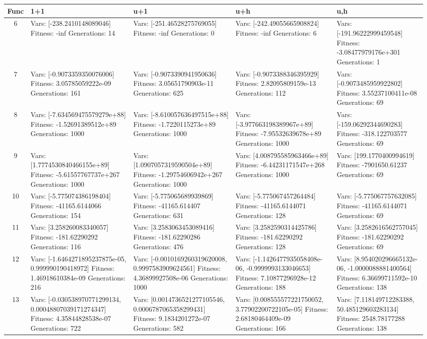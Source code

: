 \documentclass[landscape,11pt]{article}
\begin{document}
\begin{tabular}{|c|p{5.4cm}|p{5.4cm}|p{5.4cm}|p{5.4cm}|}
\hline
Func & 1+1 & u+1 & u+h & u,h \\ 
\hline 6 & Vars: [-238.2410148089046] Fitness: -inf Generations: 14 & Vars: [-251.46528275769055] Fitness: -inf Generations: 0 & Vars: [-242.49055665908824] Fitness: -inf Generations: 6 & Vars: [-191.96222999459548] Fitness: -3.08477979176e+301 Generations: 1 \\
 \hline 
 7 & Vars: [-0.9073359350076006] Fitness: 3.05785059222e-09 Generations: 161 & Vars: [-0.9073390941950636] Fitness: 3.05651790903e-11 Generations: 625 & Vars: [-0.9073388346395929] Fitness: 2.82095809159e-13 Generations: 112 & Vars: [-0.9073485959922802] Fitness: 3.55237100411e-08 Generations: 69 \\
 \hline 
 8 & Vars: [-7.634569475579279e+88] Fitness: -1.52691389512e+89 Generations: 1000 & Vars: [-8.610057636497515e+88] Fitness: -1.7220115273e+89 Generations: 1000 & Vars: [-3.977663198389967e+89] Fitness: -7.95532639678e+89 Generations: 1000 & Vars: [-159.06292344690283] Fitness: -318.122703577 Generations: 69 \\
 \hline 
 9 & Vars: [1.7774530840466155e+89] Fitness: -5.61557767737e+267 Generations: 1000 & Vars: [1.0907057319590504e+89] Fitness: -1.29754606942e+267 Generations: 1000 & Vars: [4.008795585963466e+89] Fitness: -6.44231171547e+268 Generations: 1000 & Vars: [199.1770400994619] Fitness: -7901650.61237 Generations: 69 \\
 \hline 
 10 & Vars: [-5.775074386198404] Fitness: -41165.6144066 Generations: 154 & Vars: [-5.775065689939869] Fitness: -41165.614407 Generations: 631 & Vars: [-5.775067457264484] Fitness: -41165.6144071 Generations: 128 & Vars: [-5.775067757632085] Fitness: -41165.6144071 Generations: 69 \\
 \hline 
 11 & Vars: [3.258260083340057] Fitness: -181.62290292 Generations: 116 & Vars: [3.2583063453089416] Fitness: -181.62290286 Generations: 476 & Vars: [3.2582590314425786] Fitness: -181.62290292 Generations: 128 & Vars: [3.2582616562757045] Fitness: -181.62290292 Generations: 69 \\
 \hline 
 12 & Vars: [-1.6464271895237875e-05, 0.999990190418972] Fitness: 1.46918610384e-09 Generations: 216 & Vars: [-0.0010169260319620008, 0.9997583909624561] Fitness: 4.36899927508e-06 Generations: 1000 & Vars: [-1.1426477935058408e-06, -0.9999993133046653] Fitness: 7.10877296928e-12 Generations: 188 & Vars: [8.954020296665132e-06, -1.0000088881400564] Fitness: 6.36699711592e-10 Generations: 138 \\
 \hline 
 13 & Vars: [-0.030538970771299134, 0.00048807039171274347] Fitness: 4.35844828538e-07 Generations: 722 & Vars: [0.0014736521277105546, 0.0006787065358299431] Fitness: 9.1834201272e-07 Generations: 582 & Vars: [0.008555577221750052, 3.77902200722105e-05] Fitness: 2.68180464409e-09 Generations: 166 & Vars: [7.118149712283388, 50.485129603283134] Fitness: 2548.78177288 Generations: 138 \\
 \hline 
\end{tabular}
\end{document}
